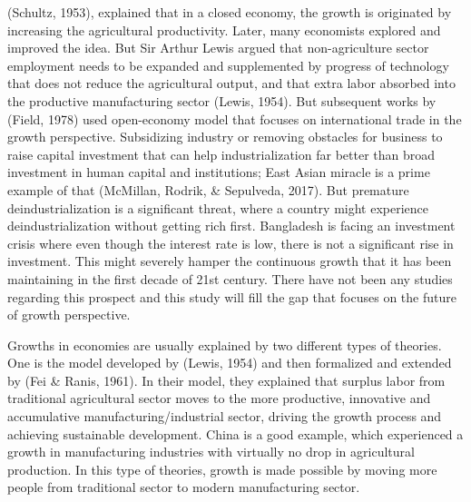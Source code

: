 \documentclass[11pt,a4paper]{article}
\begin{document}
(Schultz, 1953), explained that in a closed economy, the growth is originated by increasing the agricultural productivity. Later, many economists explored and improved the idea. But Sir Arthur Lewis argued that non-agriculture sector employment needs to be expanded and supplemented by progress of technology that does not reduce the agricultural output, and that extra labor absorbed into the productive manufacturing sector (Lewis, 1954). But subsequent works by (Field, 1978) used open-economy model that focuses on international trade in the growth perspective.  Subsidizing industry or removing obstacles for business to raise capital investment that can help industrialization far better than broad investment in human capital and institutions; East Asian miracle is a prime example of that (McMillan, Rodrik, \& Sepulveda, 2017). But premature deindustrialization is a significant threat, where a country might experience deindustrialization without getting rich first. Bangladesh is facing an investment crisis where even though the interest rate is low, there is not a significant rise in investment. This might severely hamper the continuous growth that it has been maintaining in the first decade of 21st century. There have not been any studies regarding this prospect and this study will fill the gap that focuses on the future of growth perspective. 

Growths in economies are usually explained by two different types of theories. One is the model developed by (Lewis, 1954) and then formalized and extended by (Fei \& Ranis, 1961). In their model, they explained that surplus labor from traditional agricultural sector moves to the more productive, innovative and accumulative manufacturing/industrial sector, driving the growth process and achieving sustainable development. China is a good example, which experienced a growth in manufacturing industries with virtually no drop in agricultural production. In this type of theories, growth is made possible by moving more people from traditional sector to modern manufacturing sector.  
\end{document}
